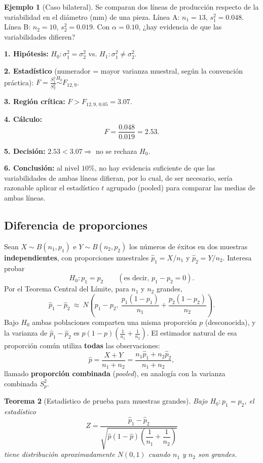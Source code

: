 \documentclass[11pt,a4paper]{article}
\theoremstyle{plain}
\newtheorem{teorema}{Teorema}[section]
\theoremstyle{definition}
\newtheorem{ejemplo}[teorema]{Ejemplo}
\theoremstyle{remark}
\begin{document}
\begin{ejemplo}[Caso bilateral]
Se comparan dos líneas de producción respecto de la variabilidad en el diámetro (mm) de una pieza. Línea A: $n_1=13$, $s_1^2=0.048$. Línea B: $n_2=10$, $s_2^2=0.019$. Con $\alpha=0.10$, ¿hay evidencia de que las variabilidades difieren?

\textbf{1. Hipótesis:} $H_0:\sigma_1^2=\sigma_2^2$ vs. $H_1:\sigma_1^2\neq\sigma_2^2$.

\textbf{2. Estadístico} (numerador = mayor varianza muestral, según la convención práctica): $\displaystyle F=\frac{S_1^2}{S_2^2}\overset{H_0}{\sim}F_{12,9}$.

\textbf{3. Región crítica:} $F>F_{12,9,\,0.05}=3.07$.

\textbf{4. Cálculo:}
\[
F=\frac{0.048}{0.019}=2.53.
\]

\textbf{5. Decisión:} $2.53<3.07\Rightarrow$ no se rechaza $H_0$.

\textbf{6. Conclusión:} al nivel $10\%$, no hay evidencia suficiente de que las variabilidades de ambas líneas difieran, por lo cual, de ser necesario, sería razonable aplicar el estadístico $t$ agrupado (pooled) para comparar las medias de ambas líneas.
\end{ejemplo}

\subsection{Diferencia de proporciones}

Sean $X\sim B(n_1,p_1)$ e $Y\sim B(n_2,p_2)$ los números de éxitos en dos muestras \textbf{independientes}, con proporciones muestrales $\hat p_1=X/n_1$ y $\hat p_2=Y/n_2$. Interesa probar
\[
H_0:p_1=p_2 \qquad (\text{es decir, } p_1-p_2=0).
\]
Por el Teorema Central del Límite, para $n_1$ y $n_2$ grandes,
\[
\hat p_1-\hat p_2\ \approx\ N\!\left(p_1-p_2,\ \frac{p_1(1-p_1)}{n_1}+\frac{p_2(1-p_2)}{n_2}\right).
\]
Bajo $H_0$ ambas poblaciones comparten una misma proporción $p$ (desconocida), y la varianza de $\hat p_1-\hat p_2$ es $p(1-p)\left(\frac{1}{n_1}+\frac{1}{n_2}\right)$. El estimador natural de esa proporción común utiliza \textbf{todas} las observaciones:
\[
\hat p=\frac{X+Y}{n_1+n_2}=\frac{n_1\hat p_1+n_2\hat p_2}{n_1+n_2},
\]
llamado \textbf{proporción combinada} (\emph{pooled}), en analogía con la varianza combinada $S_p^2$.

\begin{teorema}[Estadístico de prueba para muestras grandes]
Bajo $H_0:p_1=p_2$, el estadístico
\[
Z=\frac{\hat p_1-\hat p_2}{\sqrt{\hat p(1-\hat p)\left(\dfrac{1}{n_1}+\dfrac{1}{n_2}\right)}}
\]
tiene distribución aproximadamente $N(0,1)$ cuando $n_1$ y $n_2$ son grandes.
\end{teorema}
\end{document}
